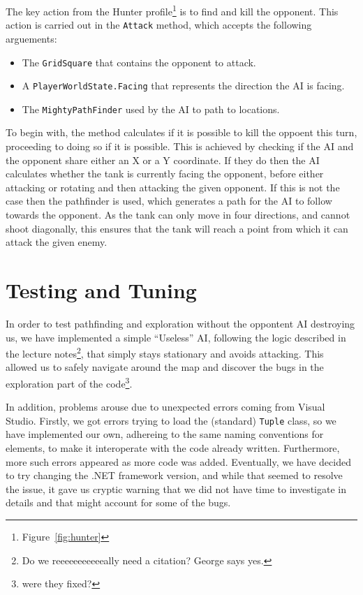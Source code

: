 \documentclass[11pt]{article}
\begin{document}
The key action from the Hunter profile\footnote{Figure~\ref{fig:hunter}} is to find and kill the opponent. This action is carried out in the \verb|Attack| method, which accepts the following arguements:
\begin{itemize}
\item The \verb|GridSquare| that contains the opponent to attack.
\item A \verb|PlayerWorldState.Facing| that represents the direction the AI is facing.
\item The \verb|MightyPathFinder| used by the AI to path to locations.
\end{itemize}

To begin with, the method calculates if it is possible to kill the oppoent this turn, proceeding to doing so if it is possible. This is achieved by checking if the AI and the opponent share either an X or a Y coordinate. If they do then the AI calculates whether the tank is currently facing the opponent, before either attacking or rotating and then attacking the given opponent. If this is not the case then the pathfinder is used, which generates a path for the AI to follow towards the opponent. As the tank can only move in four directions, and cannot shoot diagonally, this ensures that the tank will reach a point from which it can attack the given enemy.

\section{Testing and Tuning}

In order to test pathfinding and exploration without the oppontent AI destroying us, we have implemented a simple ``Useless'' AI, following the logic described in the lecture notes\footnote{Do we reeeeeeeeeeeally need a citation?	George says yes.}, that simply stays stationary and avoids attacking. This allowed us to safely navigate around the map and discover the bugs in the exploration part of the code\footnote{were they fixed?}.

In addition, problems arouse due to unexpected errors coming from Visual Studio. Firstly, we got errors trying to load the (standard) \verb|Tuple| class, so we have implemented our own, adhereing to the same naming conventions for elements, to make it interoperate with the code already written. Furthermore, more such errors appeared as more code was added. Eventually, we have decided to try changing the .NET framework version, and while that seemed to resolve the issue, it gave us cryptic warning that we did not have time to investigate in details and that might account for some of the bugs.
\end{document}
